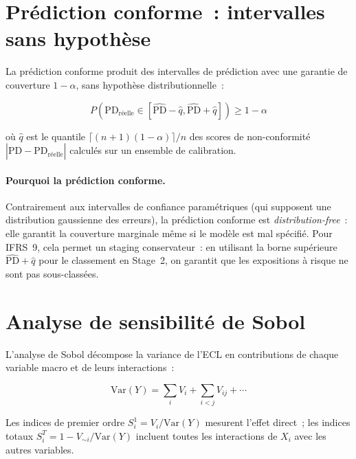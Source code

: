 \documentclass[12pt, a4paper, twoside, openright]{report}
\theoremstyle{definition}
\begin{document}
\section{Prédiction conforme~: intervalles sans hypothèse}
\label{sec:gouv:conformal}

La prédiction conforme produit des intervalles de prédiction avec une garantie de couverture $1 - \alpha$, sans hypothèse distributionnelle~:

\begin{equation}
P\!\left(\text{PD}_{\text{réelle}} \in [\hat{\text{PD}} - \hat{q}, \hat{\text{PD}} + \hat{q}]\right) \geq 1 - \alpha
\label{eq:conformal}
\end{equation}

\noindent où $\hat{q}$ est le quantile $\lceil(n+1)(1-\alpha)\rceil / n$ des scores de non-conformité $|\hat{\text{PD}} - \text{PD}_{\text{réelle}}|$ calculés sur un ensemble de calibration.

\paragraph{Pourquoi la prédiction conforme.} Contrairement aux intervalles de confiance paramétriques (qui supposent une distribution gaussienne des erreurs), la prédiction conforme est \emph{distribution-free}~: elle garantit la couverture marginale même si le modèle est mal spécifié. Pour IFRS~9, cela permet un staging conservateur~: en utilisant la borne supérieure $\hat{\text{PD}} + \hat{q}$ pour le classement en Stage~2, on garantit que les expositions à risque ne sont pas sous-classées.

\section{Analyse de sensibilité de Sobol}
\label{sec:gouv:sobol}

L'analyse de Sobol décompose la variance de l'ECL en contributions de chaque variable macro et de leurs interactions~:

\begin{equation}
\text{Var}(Y) = \sum_i V_i + \sum_{i < j} V_{ij} + \cdots
\label{eq:sobol-anova}
\end{equation}

Les indices de premier ordre $S^1_i = V_i / \text{Var}(Y)$ mesurent l'effet direct~; les indices totaux $S^T_i = 1 - V_{\sim i}/\text{Var}(Y)$ incluent toutes les interactions de $X_i$ avec les autres variables.
\end{document}

